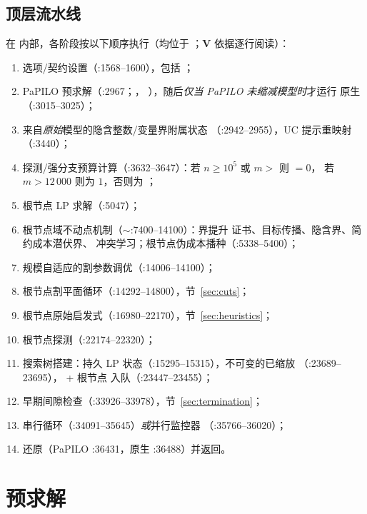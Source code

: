 \documentclass[11pt]{ctexart}
\begin{document}
\subsection{顶层流水线}
\label{sec:pipeline}
在  内部，各阶段按以下顺序执行（均位于
；\textbf{V} 依据逐行阅读）：
\begin{enumerate}[nosep]
\item 选项/契约设置（:1568--1600），包括
  ；
\item PaPILO 预求解（:2967；，
  ），随后\emph{仅当 PaPILO 未缩减模型时}才运行
  原生 （:3015--3025）；
\item 来自\emph{原始}模型的隐含整数/变量界附属状态
  （:2942--2955），UC 提示重映射（:3440）；
\item 探测/强分支预算计算（:3632--3647）：若 $n\ge 10^5$ 或
  $m>$  则 $=0$，
  若 $m>12\,000$ 则为 $1$，否则为
  ；
\item 根节点 LP 求解（:5047）；
\item 根节点域不动点机制（$\sim$:7400--14100）：界提升
  证书、目标传播、隐含界、简约成本潜伏界、
  冲突学习；根节点伪成本播种（:5338--5400）；
\item 规模自适应的割参数调优（:14006--14100）；
\item 根节点割平面循环（:14292--14800），节~\ref{sec:cuts}；
\item 根节点原始启发式（:16980--22170），节~\ref{sec:heuristics}；
\item 根节点探测（:22174--22320）；
\item 搜索树搭建：持久 LP 状态（:15295--15315），不可变的已缩放
  （:23689--23695）， + 根节点
  入队（:23447--23455）；
\item 早期间隙检查（:33926--33978），节~\ref{sec:termination}；
\item 串行循环（:34091--35645）\emph{或}并行监控器
  （:35766--36020）；
\item 还原（PaPILO :36431，原生 :36488）并返回。
\end{enumerate}

\section{预求解}
\end{document}
